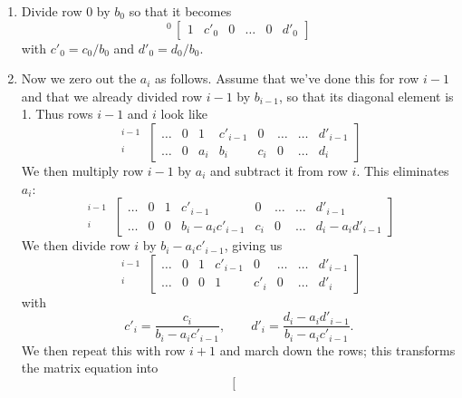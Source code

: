 \begin{sidebar}
\begin{enumerate}
\item Divide row 0 by $b_{0}$ so that it becomes%
\[
{}^{0}\,\left[\begin{array}{ccccc|c}
  1 & c'_{0} & 0& \ldots & 0 & d'_{0} \end{array}\right]
\]
with $c'_{0} = c_{0}/b_{0}$ and $d'_{0} = d_{0}/b_{0}$.
\item Now we zero out the $a_{i}$ as follows. Assume that we've done this for row $i-1$ and that we already divided row $i-1$ by $b_{i-1}$, so that its diagonal element is 1. Thus rows $i-1$ and $i$ look like
\[
\begin{array}{r} {}^{i-1}\\ {}^{i}\end{array}\,
\left[\begin{array}{ccccccc|c}
	 \ldots & 0 & 1     & c'_{i-1} & 0     & \ldots & \ldots & d'_{i-1}\\
	 \ldots & 0 & a_{i} & b_{i}    & c_{i} & 0      & \ldots & d_{i}
\end{array}\right]
\]
We then multiply row $i-1$ by $a_{i}$ and subtract it from row $i$. This eliminates $a_{i}$:
\[
\begin{array}{r} {}^{i-1}\\ {}^{i}\end{array}\,
\left[\begin{array}{ccccccc|c}
	 \ldots & 0 & 1 & c'_{i-1}            & 0     & \ldots & \ldots & d'_{i-1}\\
	 \ldots & 0 & 0 & b_{i}-a_{i}c'_{i-1} & c_{i} & 0      & \ldots & d_{i}-a_{i}d'_{i-1}
\end{array}\right]
\]
We then divide row $i$ by $b_{i}-a_{i}c'_{i-1}$, giving us
\[
\begin{array}{r} {}^{i-1}\\ {}^{i}\end{array}\,
\left[\begin{array}{ccccccc|c}
	 \ldots & 0 & 1 & c'_{i-1} & 0      & \ldots & \ldots & d'_{i-1}\\
	 \ldots & 0 & 0 & 1        & c'_{i} & 0      & \ldots & d'_{i}
\end{array}\right]
\]
with
\[ c'_{i} = \frac{c_{i}}{b_{i}-a_{i}c'_{i-1}},\qquad d'_{i} = \frac{d_{i}-a_{i}d'_{i-1}}{b_{i}-a_{i}c'_{i-1}}.
\]
We then repeat this with row $i+1$ and march down the rows; this transforms the matrix equation into
\[
\left[\begin{array}{ccccccccccc}

\end{array}\]
\end{enumerate}
\end{sidebar}
